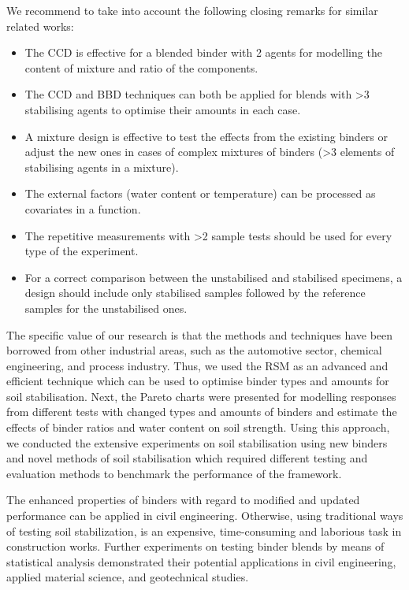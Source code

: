 \documentclass[eprint,
]{actapoly}
\begin{document}
We recommend to take into account the following closing remarks for similar related works:
\begin{itemize}
	\item The CCD is effective for a blended binder with 2 agents for modelling the content of mixture and ratio of the components.
	\item The CCD and BBD techniques can both be applied for blends with >3 stabilising agents to optimise their amounts in each case.
	\item A mixture design is effective to test the effects from the existing binders or adjust the new ones in cases of complex mixtures of binders (>3 elements of stabilising agents in a mixture).
	\item The external factors (water content or temperature) can be processed as covariates in a function.
	\item The repetitive measurements with >2 sample tests should be used for every type of the experiment.
	\item For a correct comparison between the unstabilised and stabilised specimens, a design should include only stabilised samples followed by the reference samples for the unstabilised ones.
\end{itemize}

The specific value of our research is that the methods and techniques have been borrowed from other industrial areas, such as the automotive sector, chemical engineering, and process industry. Thus, we used the RSM as an advanced and efficient technique which can be used to optimise binder types and amounts for soil stabilisation. Next, the Pareto charts were presented for modelling responses from different tests with changed types and amounts of binders and estimate the effects of binder ratios and water content on soil strength. Using this approach, we conducted the extensive experiments on soil stabilisation using new binders and novel methods of soil stabilisation which required different testing and evaluation methods to benchmark the performance of the framework. 

The enhanced properties of binders with regard to modified and updated performance can be applied in civil engineering. Otherwise, using traditional ways of testing soil stabilization, is an expensive, time-consuming and laborious task in construction works. Further experiments on testing binder blends by means of statistical analysis demonstrated their potential applications in civil engineering, applied material science, and geotechnical studies. 
\end{document}
